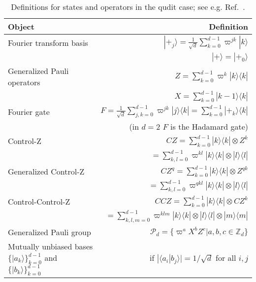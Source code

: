 \documentclass[aps,amsfonts,pra,twocolumn,showpacs]{revtex4-1}
\newcommand{\zd}{\mathbb{Z}_d}
\begin{document}
\begin{table*}[ht]
\begin{center}
	\begin{tabular}{ l | r }
	\hline
	\textbf{Object} & \textbf{Definition} \\
	\hline
	Fourier transform basis & $|+_j\rangle = \frac{1}{\sqrt{d}} \sum_{k=0}^{d-1} \varpi^{jk} |k\rangle$ \\
	& $|+\rangle=|+_0\rangle$ \\
	\hline
	Generalized Pauli operators & $Z = \sum_{k=0}^{d-1} \varpi^k |k\rangle \langle k|$ \\
	\cline{2-2}
	& $X = \sum_{k=0}^{d-1} |k-1\rangle \langle k|$ \\
	\hline
	Fourier gate & $F = \frac{1}{\sqrt{d}} \sum_{j,k=0}^{d-1} \varpi^{jk} |j\rangle \langle k| = \sum_{k=0}^{d-1} |+_k\rangle \langle k|$ \\
	& (in $d=2$ $F$ is the Hadamard gate) \\
	\hline
	Control-Z & $CZ = \sum_{k=0}^{d-1} |k\rangle \langle k| \otimes Z^k$ \\
	& $= \sum_{k,l=0}^{d-1} \varpi^{kl} |k\rangle \langle k| \otimes |l\rangle \langle l|$ \\
	\hline
	Generalized Control-Z & $CZ^q = \sum_{k=0}^{d-1} |k\rangle \langle k| \otimes Z^{qk}$ \\
	& $= \sum_{k,l=0}^{d-1} \varpi^{qkl} |k\rangle \langle k| \otimes |l\rangle \langle l|$ \\
	\hline
	Control-Control-Z & $CCZ = \sum_{k=0}^{d-1} |k\rangle \langle k| \otimes CZ^k$ \\
	& $= \sum_{k,l,m=0}^{d-1} \varpi^{klm} |k\rangle \langle k| \otimes |l\rangle \langle l| \otimes |m\rangle \langle m|$ \\
	\hline
	Generalized Pauli group & $\mathcal{P}_d = \{\varpi^aX^bZ^c | a, b, c \in \zd\}$ \\
	\hline
	Mutually unbiased bases $\{|a_k\rangle\}^{d-1}_{k=0}$ and $\{|b_k\rangle\}^{d-1}_{k=0}$ & if $|\langle a_i | b_j \rangle| = 1/\sqrt{d}$ for all $i, j$ \\
	\hline
	\end{tabular}
	\caption{Definitions for states and operators in the qudit case; see e.g.  Ref.~\cite{Hall2006}. \label{defn}}
\end{center}
\end{table*}
\end{document}
